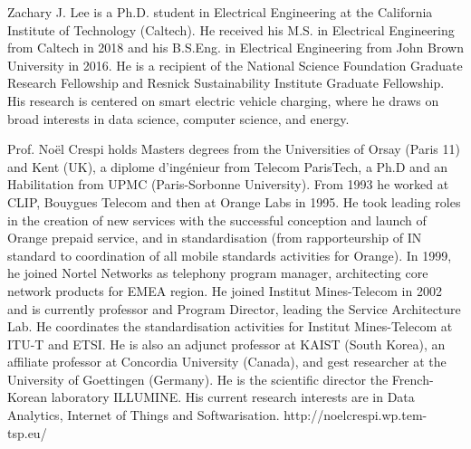 \begin{IEEEbiography}{Zachary J. Lee} is a Ph.D. student in Electrical Engineering at the California Institute of Technology (Caltech). He received his M.S.  in Electrical Engineering from Caltech in 2018 and his B.S.Eng. in Electrical Engineering from John Brown University in 2016. He is a recipient of the National Science Foundation Graduate Research Fellowship and Resnick Sustainability Institute Graduate Fellowship. His research is centered on smart electric vehicle charging, where he draws on broad interests in data science, computer science, and energy.
\end{IEEEbiography}
\begin{IEEEbiography}{Prof. No\"{e}l Crespi} holds Masters degrees from the Universities of Orsay (Paris 11) and Kent (UK), a diplome d'ing\'{e}nieur from Telecom ParisTech, a Ph.D and an Habilitation from UPMC (Paris-Sorbonne University). From 1993 he worked at CLIP, Bouygues Telecom and then at Orange Labs in 1995. He took leading roles in the creation of new services with the successful conception and launch of Orange prepaid service, and in standardisation (from rapporteurship of IN standard to coordination of all mobile standards activities for Orange). In 1999, he joined Nortel Networks as telephony program manager, architecting core network products for EMEA region. He joined Institut Mines-Telecom in 2002 and is currently professor and Program Director, leading the Service Architecture Lab. He coordinates the standardisation activities for Institut Mines-Telecom at ITU-T and ETSI. He is also an adjunct professor at KAIST (South Korea), an affiliate professor at Concordia University (Canada), and gest researcher at the University of Goettingen (Germany). He is the scientific director the French-Korean laboratory ILLUMINE. His current research interests are in Data Analytics, Internet of Things and Softwarisation.
http://noelcrespi.wp.tem-tsp.eu/
\end{IEEEbiography}	
